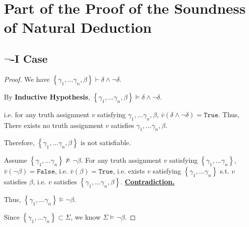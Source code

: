 \documentclass{article}
\newcommand{\set}[1]{\left\{#1\right\}}
\begin{document}
\vspace{1em}
\section{Part of the Proof of the Soundness of Natural Deduction}
\vspace{1em}
\subsection{$\boldsymbol{\neg}$-I Case}
\vspace{1em}
\begin{proof}
    We have $\set{\gamma_1,...\gamma_n,\beta}\vdash \delta\land\neg\delta$.

    \hspace{1.3em}
    By \textbf{Inductive Hypothesis}, $\set{\gamma_1,...\gamma_n,\beta}\vDash \delta\land\neg\delta$.

    \hspace{1.3em}
    i.e. for any truth assignment $v$ satisfying $\gamma_1,...\gamma_n,\beta$, $\bar{v}(\delta\land\neg\delta)=\mathtt{True}$. Thus, There exists no truth assignment $v$ satisfies $\gamma_1,...\gamma_n,\beta$.

    \hspace{1.3em}
    Therefore, $\set{\gamma_1,...\gamma_n,\beta}$ is not satisfiable. 
    
    \hspace{1.3em}
    Assume $\set{\gamma_1,...\gamma_n}\nvDash\neg\beta$. For any truth assignment $v$ satisfying $\set{\gamma_1,...\gamma_n}$, $\bar{v}(\neg\beta)=\mathtt{False}$, i.e. $\bar{v}(\beta)=\mathtt{True}$, i.e. exists $v$ satisfying $\set{\gamma_1,...\gamma_n}$ s.t. $v$ satisfies $\beta$, i.e. $v$ satisfies $\set{\gamma_1,...\gamma_n,\beta}$. \underline{\textbf{Contradiction.}}

    \hspace{1.3em}
    Thus, $\set{\gamma_1,...\gamma_n}\vDash\neg\beta$.

    \hspace{1.3em}
    Since $\set{\gamma_1,...\gamma_n}\subset\Sigma$, we know $\Sigma\vDash\neg\beta$.
\end{proof}

\vspace{1em}
\end{document}

